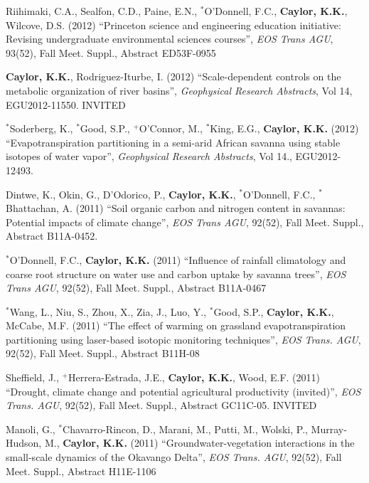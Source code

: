 \documentclass[10pt]{article}
\begin{document}
\begin{etaremune}
\item Riihimaki, C.A., Sealfon, C.D., Paine, E.N., $^{*}$O'Donnell, F.C., \textbf{Caylor, K.K.}, Wilcove, D.S. (2012) ``Princeton science and engineering education initiative: Revising undergraduate environmental sciences courses'', \emph{EOS Trans AGU}, 93(52), Fall Meet. Suppl., Abstract ED53F-0955

\item  \textbf{Caylor, K.K.}, Rodriguez-Iturbe, I. (2012) ``Scale-dependent controls on the metabolic organization of river basins'', \emph{Geophysical Research Abstracts}, Vol 14, EGU2012-11550. INVITED

\item  $^{*}$Soderberg, K., $^{*}$Good, S.P.,  $^{+}$O'Connor, M.,  $^{*}$King, E.G., \textbf{Caylor, K.K.} (2012) ``Evapotranspiration partitioning in a semi-arid African savanna using stable isotopes of water vapor'', \emph{Geophysical Research Abstracts}, Vol 14., EGU2012-12493.

\item Dintwe, K., Okin, G., D'Odorico, P., \textbf{Caylor, K.K.}, $^{*}$O'Donnell, F.C., $^{*}$Bhattachan, A. (2011) ``Soil organic carbon and nitrogen content in savannas: Potential impacts of climate change'', \emph{EOS Trans AGU}, 92(52), Fall Meet. Suppl., Abstract B11A-0452.

\item $^{*}$O'Donnell, F.C., \textbf{Caylor, K.K.} (2011) ``Influence of rainfall climatology and coarse root structure on water use and carbon uptake by savanna trees'', \emph{EOS Trans AGU}, 92(52), Fall Meet. Suppl., Abstract B11A-0467

\item  $^{*}$Wang, L., Niu, S., Zhou, X., Zia, J., Luo, Y.,  $^{*}$Good, S.P., \textbf{Caylor, K.K.}, McCabe, M.F. (2011) ``The effect of warming on grassland evapotranspiration partitioning using laser-based isotopic monitoring techniques'', \emph{EOS Trans. AGU}, 92(52), Fall Meet. Suppl., Abstract B11H-08

\item Sheffield, J., $^{+}$Herrera-Estrada, J.E.,  \textbf{Caylor, K.K.}, Wood, E.F. (2011) ``Drought, climate change and potential agricultural productivity (invited)'', \emph{EOS Trans. AGU}, 92(52), Fall Meet. Suppl., Abstract GC11C-05. INVITED

\item Manoli, G.,  $^{*}$Chavarro-Rincon, D., Marani, M., Putti, M., Wolski, P., Murray-Hudson, M.,  \textbf{Caylor, K.K.} (2011) ``Groundwater-vegetation interactions in the small-scale dynamics of the Okavango Delta'', \emph{EOS Trans. AGU}, 92(52), Fall Meet. Suppl., Abstract H11E-1106


\end{etaremune}
\end{document}
